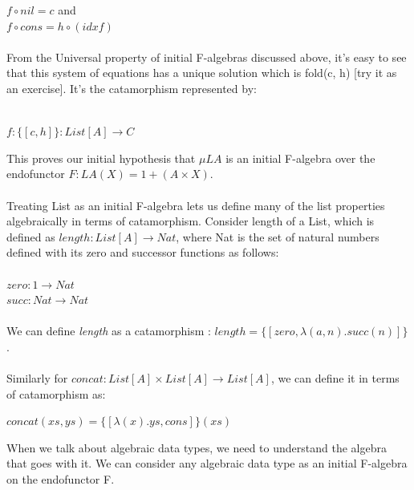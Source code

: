 \documentclass{article}
\begin{document}
$f \circ nil = c$  and \\
$f \circ cons = h \circ (id x f)$ \\ \\
From the Universal property of initial F-algebras discussed above, it's easy to see that this system of equations has a unique solution which is fold(c, h) [try it as an exercise]. It's the catamorphism represented by: \\ \\
\begin{center}
 $f: \{ [c, h] \} : List[A] \rightarrow C$
\end{center}
This proves our initial hypothesis that $\mu LA$ is an initial F-algebra over the endofunctor $F: LA(X) = 1 + (A \times X)$. \\ \\
Treating List as an initial F-algebra lets us define many of the list properties algebraically in terms of catamorphism. Consider length of a List, which is defined as $length: List[A] \rightarrow Nat$, where Nat is the set of natural numbers defined with its zero and successor functions as follows: \\ \\
$zero: 1 \rightarrow Nat$ \\
$succ: Nat \rightarrow Nat$ \\ \\
We can define \textit{length} as a catamorphism : $length = \{ [zero, \lambda(a, n).succ(n)] \}$. \\ \\
Similarly for $concat: List[A] \times List[A] \rightarrow List[A]$, we can define it in terms of catamorphism as:

\begin{center}
$concat(xs, ys) = \{ [\lambda(x).ys, cons] \}(xs)$
\end{center}

When we talk about algebraic data types, we need to understand the algebra that goes with it. We can consider any algebraic data type as an initial F-algebra on the endofunctor F.
\end{document}
